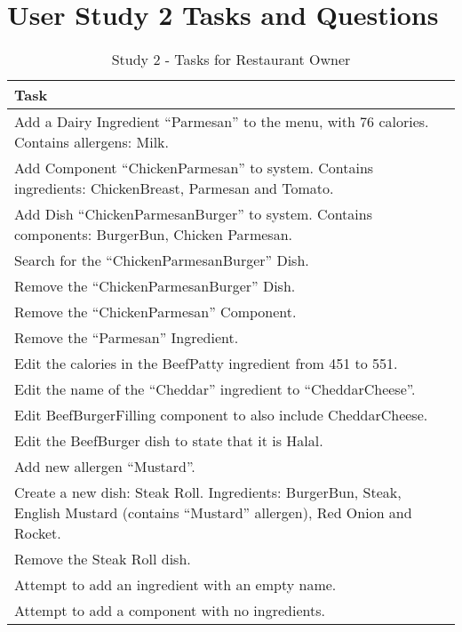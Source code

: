 \chapter{User Study 2 Tasks and Questions}
\label{app:study2}


\begin{table}[h]
    \centering
    \begin{tabular}{ |p{\textwidth}| }
    \hline
    \textbf{Task}\\
    \hline
    Add a Dairy Ingredient ``Parmesan'' to the menu, with 76 calories. Contains allergens: Milk. \\
    \hline
    Add Component ``ChickenParmesan'' to system. Contains ingredients: ChickenBreast, Parmesan and Tomato. \\
    \hline
    Add Dish ``ChickenParmesanBurger'' to system. Contains components: BurgerBun, Chicken Parmesan. \\
    \hline
    Search for the ``ChickenParmesanBurger'' Dish. \\
    \hline
    Remove the ``ChickenParmesanBurger'' Dish. \\
    \hline
    Remove the ``ChickenParmesan'' Component. \\
    \hline
    Remove the ``Parmesan'' Ingredient. \\
    \hline
    Edit the calories in the BeefPatty ingredient from 451 to 551. \\
    \hline
    Edit the name of the ``Cheddar'' ingredient to ``CheddarCheese''. \\
    \hline
    Edit BeefBurgerFilling component to also include CheddarCheese. \\
    \hline
    Edit the BeefBurger dish to state that it is Halal. \\
    \hline
    Add new allergen ``Mustard''. \\
    \hline
    Create a new dish: Steak Roll. Ingredients: BurgerBun, Steak, English Mustard (contains ``Mustard'' allergen), Red Onion and Rocket. \\
    \hline
    Remove the Steak Roll dish. \\
    \hline
    Attempt to add an ingredient with an empty name. \\
    \hline
    Attempt to add a component with no ingredients. \\
    \hline
    \end{tabular}
    \caption{Study 2 - Tasks for Restaurant Owner}
    \label{tab:Study2TasksRO}
\end{table}


